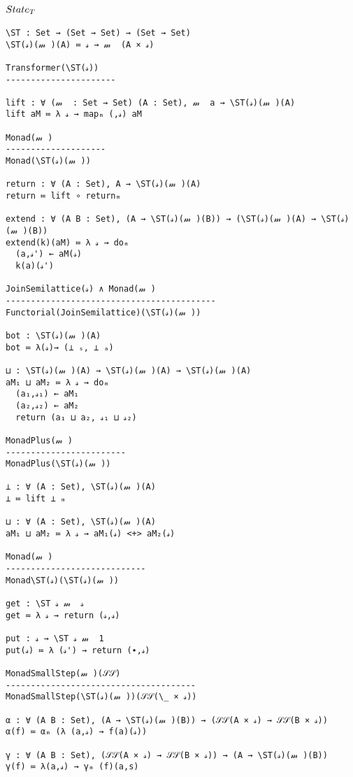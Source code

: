 \documentclass{article}
\begin{document}


\subsection{$State_T$}
\label{section:Proofs:StateT}

\begin{verbatim}
\ST : Set → (Set → Set) → (Set → Set)
\ST(𝓈)(𝓂 )(A) ≔ 𝓈 → 𝓂  (A × 𝓈)

Transformer(\ST(𝓈))
----------------------

lift : ∀ (𝓂  : Set → Set) (A : Set), 𝓂  a → \ST(𝓈)(𝓂 )(A)
lift aM ≔ λ 𝓈 → mapₘ (,𝓈) aM

Monad(𝓂 )
--------------------
Monad(\ST(𝓈)(𝓂 ))

return : ∀ (A : Set), A → \ST(𝓈)(𝓂 )(A)
return ≔ lift ∘ returnₘ

extend : ∀ (A B : Set), (A → \ST(𝓈)(𝓂 )(B)) → (\ST(𝓈)(𝓂 )(A) → \ST(𝓈)(𝓂 )(B))
extend(k)(aM) ≔ λ 𝓈 → doₘ
  (a,𝓈') ← aM(𝓈)
  k(a)(𝓈')

JoinSemilattice(𝓈) ∧ Monad(𝓂 )
------------------------------------------
Functorial(JoinSemilattice)(\ST(𝓈)(𝓂 ))

bot : \ST(𝓈)(𝓂 )(A)
bot ≔ λ(𝓈)→ (⊥ ₛ, ⊥ ₐ)

⊔ : \ST(𝓈)(𝓂 )(A) → \ST(𝓈)(𝓂 )(A) → \ST(𝓈)(𝓂 )(A)
aM₁ ⊔ aM₂ ≔ λ 𝓈 → doₘ
  (a₁,𝓈₁) ← aM₁
  (a₂,𝓈₂) ← aM₂
  return (a₁ ⊔ a₂, 𝓈₁ ⊔ 𝓈₂)

MonadPlus(𝓂 )
------------------------
MonadPlus(\ST(𝓈)(𝓂 ))

⊥ : ∀ (A : Set), \ST(𝓈)(𝓂 )(A)
⊥ ≔ lift ⊥ ₘ

⊔ : ∀ (A : Set), \ST(𝓈)(𝓂 )(A)
aM₁ ⊔ aM₂ ≔ λ 𝓈 → aM₁(𝓈) <+> aM₂(𝓈)

Monad(𝓂 )
----------------------------
Monad\ST(𝓈)(\ST(𝓈)(𝓂 ))

get : \ST 𝓈 𝓂  𝓈
get ≔ λ 𝓈 → return (𝓈,𝓈)

put : 𝓈 → \ST 𝓈 𝓂  1
put(𝓈) ≔ λ (𝓈') → return (∙,𝓈)

MonadSmallStep(𝓂 )(𝒮𝒮)
--------------------------------------
MonadSmallStep(\ST(𝓈)(𝓂 ))(𝒮𝒮(\_ × 𝓈))

α : ∀ (A B : Set), (A → \ST(𝓈)(𝓂 )(B)) → (𝒮𝒮(A × 𝓈) → 𝒮𝒮(B × 𝓈))
α(f) ≔ αₘ (λ (a,𝓈) → f(a)(𝓈))

γ : ∀ (A B : Set), (𝒮𝒮(A × 𝓈) → 𝒮𝒮(B × 𝓈)) → (A → \ST(𝓈)(𝓂 )(B))
γ(f) ≔ λ(a,𝓈) → γₘ (f)(a,s)
\end{verbatim}


\end{document}

